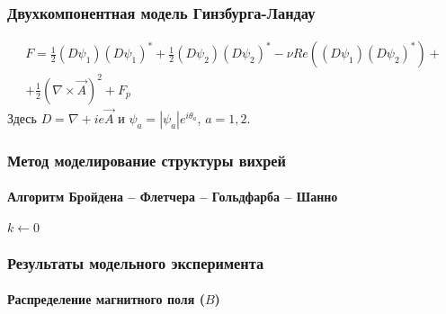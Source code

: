 \begin{frame}
    \frametitle{Двухкомпонентная модель Гинзбурга-Ландау}
    \begin{gather}
        F = \frac{1}{2}(D\psi_1)(D\psi_1)^* + 
            \frac{1}{2}(D\psi_2)(D\psi_2)^* -
            \nu Re\left( (D\psi_1)(D\psi_2)^* \right) + \nonumber \\ +
            \frac{1}{2}\left(\nabla\times\vec{A}\right)^2 + F_p
    \end{gather}
    Здесь \( D = \nabla + ie\vec{A} \) и \( \psi_a = |\psi_a|e^{i\theta_a} \), 
    \( a = 1,2 \).
\end{frame}

\begin{frame}
    \frametitle{Метод моделирование структуры вихрей}
    \framesubtitle{Алгоритм Бройдена -- Флетчера -- Гольдфарба -- Шанно}
    \begin{center}
        \begin{minipage}{2in}
            \begin{algorithm}[H]
                \scriptsize
                \SetAlgoLined
                $k \gets 0$\;
            \end{algorithm}
        \end{minipage}
    \end{center}
\end{frame}

\begin{frame}
    \frametitle{Результаты модельного эксперимента}
    \framesubtitle{Распределение магнитного поля (\( B \))}
    \begin{figure}[h]
        \begin{minipage}[h]{0.49\linewidth}
            \center{\texttt{[image: 3d\_B]}}
        \end{minipage}
        \hfill
        \begin{minipage}[h]{0.49\linewidth}
        \end{minipage}
    \end{figure}
\end{frame}

